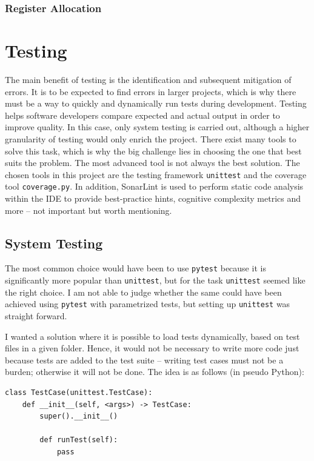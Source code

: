 \subsection{Register Allocation}

\chapter{Testing}
The main benefit of testing is the identification and subsequent mitigation of errors. It is to be expected to find errors in larger projects, which is why there must be a way to quickly and dynamically run tests during development. Testing helps software developers compare expected and actual output in order to improve quality. In this case, only system testing is carried out, although a higher granularity of testing would only enrich the project. There exist many tools to solve this task, which is why the big challenge lies in choosing the one that best suits the problem. The most advanced tool is not always the best solution. The chosen tools in this project are the testing framework \texttt{unittest} and the coverage tool \texttt{coverage.py}. In addition, SonarLint is used to perform static code analysis within the IDE to provide best-practice hints, cognitive complexity metrics and more -- not important but worth mentioning.

\section{System Testing}
The most common choice would have been to use \texttt{pytest} because it is significantly more popular than \texttt{unittest}, but for the task \texttt{unittest} seemed like the right choice. I am not able to judge whether the same could have been achieved using \texttt{pytest} with parametrized tests, but setting up \texttt{unittest} was straight forward.

I wanted a solution where it is possible to load tests dynamically, based on test files in a given folder. Hence, it would not be necessary to write more code just because tests are added to the test suite -- writing test cases must not be a burden; otherwise it will not be done. The idea is as follows (in pseudo Python):

\begin{verbatim}
class TestCase(unittest.TestCase):
    def __init__(self, <args>) -> TestCase:
        super().__init__()

        def runTest(self):
            pass
\end{verbatim}

